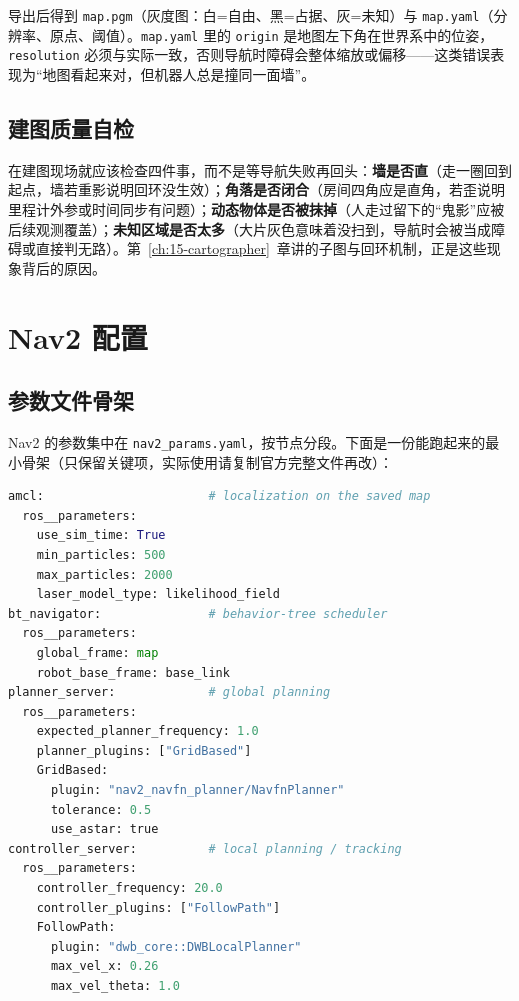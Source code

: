 导出后得到 \texttt{map.pgm}（灰度图：白=自由、黑=占据、灰=未知）与 \texttt{map.yaml}（分辨率、原点、阈值）。\texttt{map.yaml} 里的 \texttt{origin} 是地图左下角在世界系中的位姿，\texttt{resolution} 必须与实际一致，否则导航时障碍会整体缩放或偏移——这类错误表现为“地图看起来对，但机器人总是撞同一面墙”。

\subsection{建图质量自检}

在建图现场就应该检查四件事，而不是等导航失败再回头：\textbf{墙是否直}（走一圈回到起点，墙若重影说明回环没生效）；\textbf{角落是否闭合}（房间四角应是直角，若歪说明里程计外参或时间同步有问题）；\textbf{动态物体是否被抹掉}（人走过留下的“鬼影”应被后续观测覆盖）；\textbf{未知区域是否太多}（大片灰色意味着没扫到，导航时会被当成障碍或直接判无路）。第~\ref{ch:15-cartographer}~章讲的子图与回环机制，正是这些现象背后的原因。

\section{Nav2 配置}\label{sec:22-nav2}

\subsection{参数文件骨架}

Nav2 的参数集中在 \texttt{nav2\_params.yaml}，按节点分段。下面是一份能跑起来的最小骨架（只保留关键项，实际使用请复制官方完整文件再改）：

\begin{lstlisting}[language=Python]
amcl:                       # localization on the saved map
  ros__parameters:
    use_sim_time: True
    min_particles: 500
    max_particles: 2000
    laser_model_type: likelihood_field
bt_navigator:               # behavior-tree scheduler
  ros__parameters:
    global_frame: map
    robot_base_frame: base_link
planner_server:             # global planning
  ros__parameters:
    expected_planner_frequency: 1.0
    planner_plugins: ["GridBased"]
    GridBased:
      plugin: "nav2_navfn_planner/NavfnPlanner"
      tolerance: 0.5
      use_astar: true
controller_server:          # local planning / tracking
  ros__parameters:
    controller_frequency: 20.0
    controller_plugins: ["FollowPath"]
    FollowPath:
      plugin: "dwb_core::DWBLocalPlanner"
      max_vel_x: 0.26
      max_vel_theta: 1.0
\end{lstlisting}

